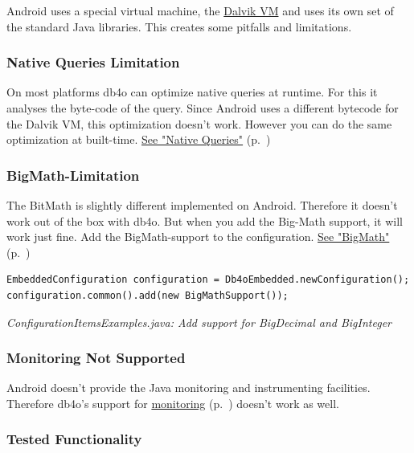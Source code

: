 Android uses a special virtual machine, the \href{http://en.wikipedia.org/wiki/Dalvik_virtual_machine}{Dalvik VM} and uses its own set of the standard Java libraries. This creates some pitfalls and limitations.

\subsubsection*{Native Queries Limitation}

On most platforms db4o can optimize native queries at runtime. For this it analyses the byte-code of the query. Since Android uses a different bytecode for the Dalvik VM, this optimization doesn't work. However you can do the same optimization at built-time. \hyperref[ref:platform-specific-issues-android-native-queries]{See "Native Queries"} (p.~\pageref{ref:platform-specific-issues-android-native-queries})

\subsubsection*{BigMath-Limitation}

The BitMath is slightly different implemented on Android. Therefore it doesn't work out of the box with db4o. But when you add the Big-Math support, it will work just fine. Add the BigMath-support to the configuration. \hyperref[ref:advanced-topics-type-handling-bigmath]{See "BigMath"} (p.~\pageref{ref:advanced-topics-type-handling-bigmath})

\begin{lstlisting}
EmbeddedConfiguration configuration = Db4oEmbedded.newConfiguration();
configuration.common().add(new BigMathSupport());
\end{lstlisting}

{\small\itshape ConfigurationItemsExamples.java: Add support for BigDecimal and BigInteger\par}
\medskip

\subsubsection*{Monitoring Not Supported}

Android doesn't provide the Java monitoring and instrumenting facilities. Therefore db4o's support for \hyperref[ref:advanced-topics-runtime-statistics]{monitoring} (p.~\pageref{ref:advanced-topics-runtime-statistics}) doesn't work as well.

\subsubsection*{Tested Functionality}

